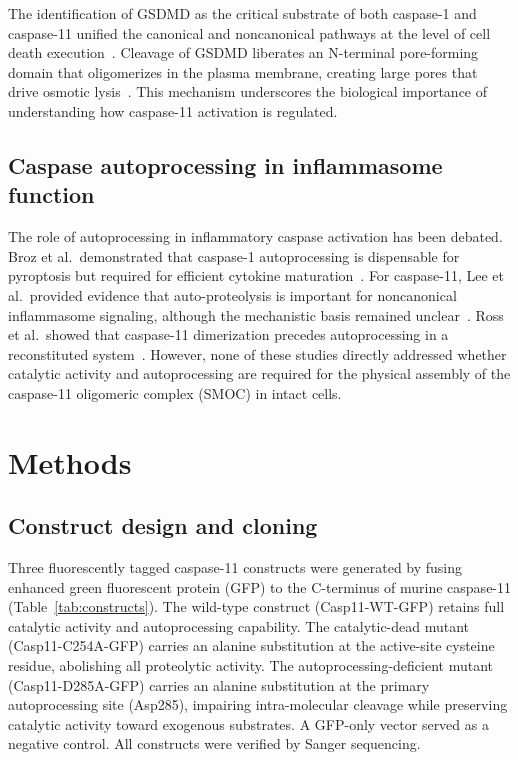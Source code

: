 \documentclass[11pt,a4paper]{article}
\begin{document}
The identification of GSDMD as the critical substrate of both caspase-1 and caspase-11 unified the canonical and noncanonical pathways at the level of cell death execution~\citep{shi2015, kayagaki2015}. Cleavage of GSDMD liberates an N-terminal pore-forming domain that oligomerizes in the plasma membrane, creating large pores that drive osmotic lysis~\citep{liu2016, ding2016}. This mechanism underscores the biological importance of understanding how caspase-11 activation is regulated.

\subsection{Caspase autoprocessing in inflammasome function}

The role of autoprocessing in inflammatory caspase activation has been debated. Broz et al.\ demonstrated that caspase-1 autoprocessing is dispensable for pyroptosis but required for efficient cytokine maturation~\citep{broz2010}. For caspase-11, Lee et al.\ provided evidence that auto-proteolysis is important for noncanonical inflammasome signaling, although the mechanistic basis remained unclear~\citep{lee2018}. Ross et al.\ showed that caspase-11 dimerization precedes autoprocessing in a reconstituted system~\citep{ross2022}. However, none of these studies directly addressed whether catalytic activity and autoprocessing are required for the physical assembly of the caspase-11 oligomeric complex (SMOC) in intact cells.

\section{Methods}
\label{sec:methods}

\subsection{Construct design and cloning}

Three fluorescently tagged caspase-11 constructs were generated by fusing enhanced green fluorescent protein (GFP) to the C-terminus of murine caspase-11 (Table~\ref{tab:constructs}). The wild-type construct (Casp11-WT-GFP) retains full catalytic activity and autoprocessing capability. The catalytic-dead mutant (Casp11-C254A-GFP) carries an alanine substitution at the active-site cysteine residue, abolishing all proteolytic activity. The autoprocessing-deficient mutant (Casp11-D285A-GFP) carries an alanine substitution at the primary autoprocessing site (Asp285), impairing intra-molecular cleavage while preserving catalytic activity toward exogenous substrates. A GFP-only vector served as a negative control. All constructs were verified by Sanger sequencing.
\end{document}
